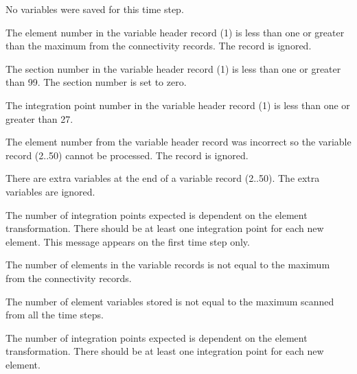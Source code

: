 {
No variables were saved for this time step.
}

{
The element number in the variable header record (1) is less than one or
greater than the maximum from the connectivity records. The record is
ignored.
}

{
The section number in the variable header record (1) is less than one or
greater than 99. The section number is set to zero.
}

{
The integration point number in the variable header record (1) is less
than one or greater than 27.
}

{
The element number from the variable header record was incorrect so the
variable record (2..50) cannot be processed. The record is ignored.
}

{
There are extra variables at the end of a variable record (2..50). The
extra variables are ignored.
}

{
The number of integration points expected is dependent on the element
transformation. There should be at least one integration point for each
new element. This message appears on the first time step only.
}

{
The number of elements in the variable records is not equal to the
maximum from the connectivity records.
}

{
The number of element variables stored is not equal to the maximum
scanned from all the time steps.
}

{
The number of integration points expected is dependent on the element
transformation. There should be at least one integration point for each
new element.
}

